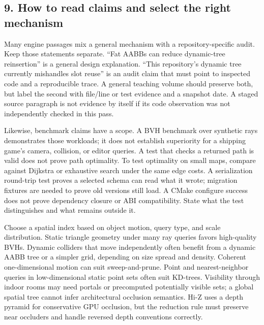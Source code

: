 \subsection{9. How to read claims and select the right mechanism}\label{05-engine-i-ch008-how-to-read-claims-and-select-the-right-mechanism}

\hypertarget{05-engine-i-ch008-how-to-read-claims-and-select-the-right-mechanism}{}

Many engine passages mix a general mechanism with a repository-specific audit. Keep those statements separate. ``Fat AABBs can reduce dynamic-tree reinsertion'' is a general design explanation. ``This repository's dynamic tree currently mishandles slot reuse'' is an audit claim that must point to inspected code and a reproducible trace. A general teaching volume should preserve both, but label the second with file/line or test evidence and a snapshot date. A staged source paragraph is not evidence by itself if its code observation was not independently checked in this pass.

Likewise, benchmark claims have a scope. A BVH benchmark over synthetic rays demonstrates those workloads; it does not establish superiority for a shipping game's camera, collision, or editor queries. A test that checks a returned path is valid does not prove path optimality. To test optimality on small maps, compare against Dijkstra or exhaustive search under the same edge costs. A serialization round-trip test proves a selected schema can read what it wrote; migration fixtures are needed to prove old versions still load. A CMake configure success does not prove dependency closure or ABI compatibility. State what the test distinguishes and what remains outside it.

Choose a spatial index based on object motion, query type, and scale distribution. Static triangle geometry under many ray queries favors high-quality BVHs. Dynamic colliders that move independently often benefit from a dynamic AABB tree or a simpler grid, depending on size spread and density. Coherent one-dimensional motion can suit sweep-and-prune. Point and nearest-neighbor queries in low-dimensional static point sets often suit KD-trees. Visibility through indoor rooms may need portals or precomputed potentially visible sets; a global spatial tree cannot infer architectural occlusion semantics. Hi-Z uses a depth pyramid for conservative GPU occlusion, but the reduction rule must preserve near occluders and handle reversed depth conventions correctly.

